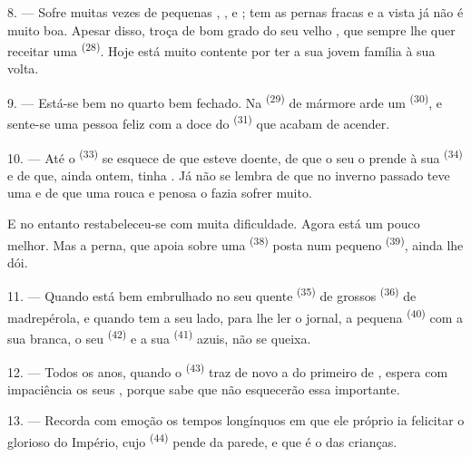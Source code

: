 8. --- Sofre muitas vezes de pequenas ,
,  e ; tem as
pernas fracas e a vista já não é muito boa. Apesar disso, troça de bom
grado do seu velho , que sempre lhe quer receitar uma
 \textsuperscript{(28)}. Hoje está muito contente por ter a sua
jovem família à sua volta.

9. --- Está-se bem no quarto bem fechado. Na 
\textsuperscript{(29)} de mármore arde um 
\textsuperscript{(30)}, e sente-se uma pessoa feliz com a doce  do
 \textsuperscript{(31)} que acabam de acender.

\VUsaut{4.2mm}
\VUsaut{3.0mm}

10. --- Até o  \textsuperscript{(33)} se esquece de que esteve doente,
de que o seu  o prende à sua 
\textsuperscript{(34)} e de que, ainda ontem, tinha .
Já não se lembra de que no inverno passado teve uma  e
de que uma  rouca e penosa o fazia sofrer muito.

E no entanto restabeleceu-se com muita dificuldade. Agora está um pouco
melhor. Mas a perna, que apoia sobre uma 
\textsuperscript{(38)} posta num pequeno  \textsuperscript{(39)}, ainda
lhe dói.

11. --- Quando está bem embrulhado no seu quente 
\textsuperscript{(35)} de grossos  \textsuperscript{(36)} de madrepérola,
e quando tem a seu lado, para lhe ler o jornal, a pequena 
\textsuperscript{(40)} com a sua  branca, o seu 
\textsuperscript{(42)} e a sua  \textsuperscript{(41)} azuis, não se
queixa.

12. --- Todos os anos, quando o  \textsuperscript{(43)} traz de
novo a  do primeiro de , espera com
impaciência os seus , porque sabe que não esquecerão essa
 importante.

13. --- Recorda com emoção os tempos longínquos em que ele próprio ia
felicitar o glorioso  do Império, cujo 
\textsuperscript{(44)} pende da parede, e que é o  das crianças.
\VUsaut{6.0mm}
\VUfilet{22mm}
